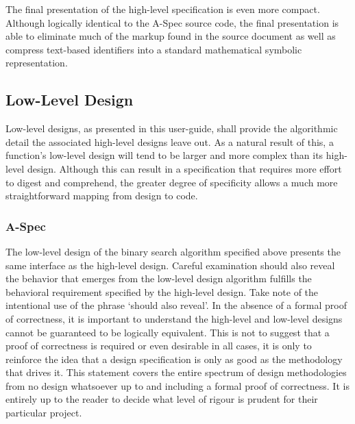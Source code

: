 \documentclass[letterpaper,10pt,draft]{book}
\begin{document}


The final presentation of the high-level specification is even more compact.  Although
logically identical to the A-Spec source code, the final presentation is able to
eliminate much of the markup found in the source document as well as compress text-based
identifiers into a standard mathematical symbolic representation.

\let\OZPARList\undefined
\let\OZPARFinnd\undefined

\newpage
\subsection{Low-Level Design}
   \label{sect:FirstExLLD}

Low-level designs, as presented in this user-guide, shall provide the algorithmic
detail the associated high-level designs leave out.  As a natural result of this,
a function's low-level design will tend to be larger and more complex than its high-level
design.  Although this can result in a specification that requires more effort to
digest and comprehend, the greater degree of specificity allows a much more straightforward
mapping from design to code.

\subsubsection{A-Spec}
   \label{sect:FirstExLLDA}



The low-level design of the binary search algorithm specified above presents the
same interface as the high-level design.  Careful examination should also reveal
the behavior that emerges from the low-level design algorithm fulfills the behavioral
requirement specified by the high-level design.  Take note of the intentional use
of the phrase `should also reveal'.  In the absence of a formal proof of correctness,
it is important to understand the high-level and low-level designs cannot be guaranteed
to be logically equivalent.  This is not to suggest that a proof of correctness
is required or even desirable in all cases, it is only to reinforce the idea that
a design specification is only as good as the methodology that drives it.  This
statement covers the entire spectrum of design methodologies from no design whatsoever
up to and including a formal proof of correctness.  It is entirely up to the reader
to decide what level of rigour is prudent for their particular project.
\end{document}
